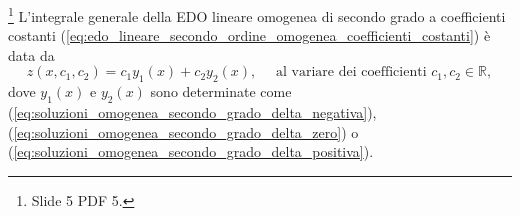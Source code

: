 \begin{theorem}\footnote{Slide 5 PDF 5.}
	L'integrale generale della EDO lineare omogenea di secondo grado a coefficienti costanti (\ref{eq:edo_lineare_secondo_ordine_omogenea_coefficienti_costanti}) è data da
	\begin{equation}\label{eq:integrale_generale_edo_lineare_secondo_ordine_omogenea_coefficienti_costanti}
		z(x,c_1,c_2) = c_1y_1(x) + c_2y_2(x),\quad \text{ al variare dei coefficienti } c_1,c_2\in\mathbb{R},
	\end{equation}
	dove $y_1(x)$ e $y_2(x)$ sono determinate come (\ref{eq:soluzioni_omogenea_secondo_grado_delta_negativa}), (\ref{eq:soluzioni_omogenea_secondo_grado_delta_zero}) o  (\ref{eq:soluzioni_omogenea_secondo_grado_delta_positiva}).
\end{theorem}
